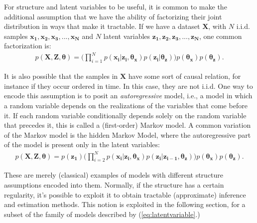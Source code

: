 For structure and latent variables to be useful, it is common to make the additional
assumption that we have the ability of factorizing their joint distribution in ways that
make it tractable. If we have a dataset $\bm{X}$, with $N$ i.i.d. samples $\bm{x_1}, \bm{x_2}, \bm{x_3}, ..., \bm{x_N}$
and $N$ latent variables $\bm{z_1}, \bm{z_2}, \bm{z_3}, ..., \bm{z_N}$, one common factorization is:
\begin{align}
    p(\bm{X}, \bm{Z}, \bm{\theta}) = \Big(\prod^N_{i=1} p(\bm{x_i}| \bm{z_i}, \bm{\theta_x})
                                                        p(\bm{z_i} | \bm{\theta_z})\Big) 
                                                        p(\bm{\theta_x})
                                                        p(\bm{\theta_z}). \label{eq:latentvariable}
\end{align}

It is also possible that the samples in $\bm{X}$ have some sort of causal
relation, for instance if they occur ordered in time. In this case, they are not i.i.d.
One way to encode this assumption is to posit an \emph{autoregressive} model, i.e.,
a model in which a random variable depends on the realizations of the variables
that come before it. If each random variable conditionally depends solely on the
random variable that precedes it, this is called a (first-order) Markov model.
A common variation of the Markov model is the hidden Markov Model, where the
autoregressive part of the model is present only in the latent variables:
\begin{align}
    p(\bm{X}, \bm{Z}, \bm{\theta}) = p(\bm{z_1}) \Big(\prod^N_{i=2} p(\bm{x_i} | \bm{z_i}, \bm{\theta_x})
                                     p(\bm{z_i}| \bm{z_{i-1}}, \bm{\theta_z}) \Big)
                                     p(\bm{\theta_x}) p(\bm{\theta_z}).
\end{align}

These are merely (classical) examples of models with different structure assumptions encoded
into them. Normally, if the structure has a certain regularity, it's possible
to exploit it to obtain tractable (approximate) inference and estimation methods.
This notion is exploited in the following section, for a subset of the family
of models described by (\ref{eq:latentvariable}.)

